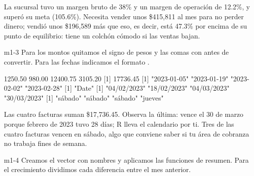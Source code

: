 La sucursal tuvo un margen bruto de 38\% y un margen de operación de
12.2\%, y superó su meta (105.6\%). Necesita vender unos \$415,811 al mes para
no perder dinero; vendió unos \$196,589 más que eso, es decir, está 47.3\% por
encima de su punto de equilibrio: tiene un colchón cómodo si las ventas
bajan.


\begin{solucion}{m1-3}
Para los montos quitamos el signo de pesos y las comas con 
antes de convertir. Para las fechas indicamos el formato
.
\end{solucion}

\begin{rsalida}
[1]  1250.50   980.00 12400.75  3105.20
[1] 17736.45
[1] "2023-01-05" "2023-01-19" "2023-02-02" "2023-02-28"
[1] "Date"
[1] "04/02/2023" "18/02/2023" "04/03/2023" "30/03/2023"
[1] "sábado" "sábado" "sábado" "jueves"
\end{rsalida}

Las cuatro facturas suman \$17,736.45. Observa la última: vence el 30 de
marzo porque febrero de 2023 tuvo 28 días; R lleva el calendario por ti.
Tres de las cuatro facturas vencen en sábado, algo que conviene saber si tu área de
cobranza no trabaja fines de semana.


\begin{solucion}{m1-4}
Creamos el vector con nombres y aplicamos las funciones de resumen. Para el
crecimiento dividimos cada diferencia entre el mes anterior.
\end{solucion}

